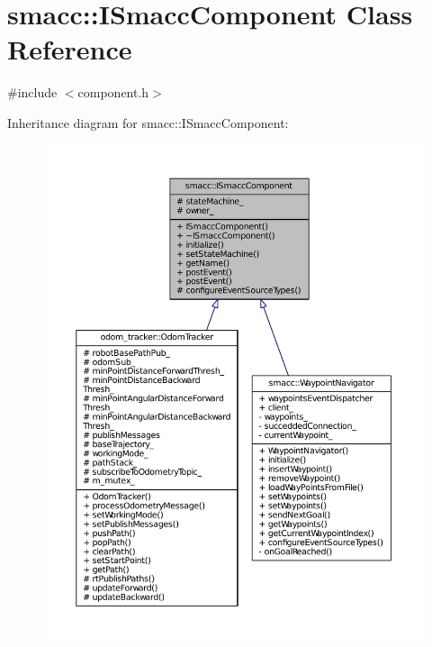 \hypertarget{classsmacc_1_1ISmaccComponent}{}\section{smacc\+:\+:I\+Smacc\+Component Class Reference}
\label{classsmacc_1_1ISmaccComponent}


{\ttfamily \#include $<$component.\+h$>$}



Inheritance diagram for smacc\+:\+:I\+Smacc\+Component\+:
\nopagebreak
\begin{figure}[H]
\begin{center}
\leavevmode
\includegraphics[width=350pt]{classsmacc_1_1ISmaccComponent__inherit__graph}
\end{center}
\end{figure}


